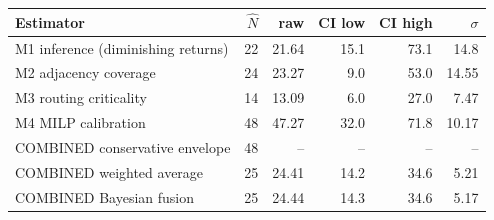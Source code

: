 \begin{tabular}{lrrrrr}
\toprule
Estimator & $\hat N$ & raw & CI low & CI high & $\sigma$ \\
\midrule
M1 inference (diminishing returns) & 22 & 21.64 & 15.1 & 73.1 & 14.8 \\
M2 adjacency coverage & 24 & 23.27 & 9.0 & 53.0 & 14.55 \\
M3 routing criticality & 14 & 13.09 & 6.0 & 27.0 & 7.47 \\
M4 MILP calibration & 48 & 47.27 & 32.0 & 71.8 & 10.17 \\
\midrule
COMBINED conservative envelope & 48 & -- & -- & -- & -- \\
\midrule
COMBINED weighted average & 25 & 24.41 & 14.2 & 34.6 & 5.21 \\
\midrule
COMBINED Bayesian fusion & 25 & 24.44 & 14.3 & 34.6 & 5.17 \\
\bottomrule
\end{tabular}